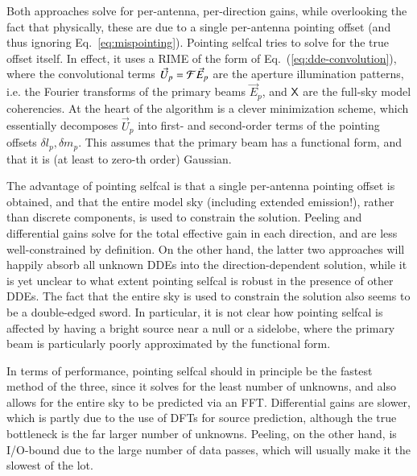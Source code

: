 \documentclass{aa}
\newcommand{\jones}[2]{\vec {#1}_{#2}}
\newcommand{\coh}[2]{\mathsf{{#1}}_{{#2}}}
\begin{document}
Both approaches solve for per-antenna, per-direction gains, while overlooking the fact that physically, these are due to a single per-antenna pointing offset (and thus ignoring Eq.~\ref{eq:mispointing}). Pointing selfcal tries to solve for the true offset itself. In effect, it uses a RIME of the form of Eq.~(\ref{eq:dde-convolution}), where the convolutional terms $\jones{U}{p}={\cal F}\jones{E}{p}$ are the aperture illumination patterns, i.e. the Fourier transforms of the primary beams $\jones{E}{p}$, and $\coh{X}{}$ are the full-sky model coherencies. At the heart of the algorithm is a clever minimization scheme, which essentially decomposes $\jones{U}{p}$ into first- and second-order terms of the pointing offsets $\delta l_p,\delta m_p$. This assumes that the primary beam has a functional form, and that it is (at least to zero-th order) Gaussian. 

The advantage of pointing selfcal is that a single per-antenna pointing offset is obtained, and that the entire model sky (including extended emission!), rather than discrete components, is used to constrain the solution. Peeling and differential gains solve for the total effective gain in each direction, and are less well-constrained by definition. On the other hand, the latter two approaches will happily absorb all unknown DDEs into the direction-dependent solution, while it is yet unclear to what extent pointing selfcal is robust in the presence of other DDEs. The fact that the entire sky is used to constrain the solution also seems to be a double-edged sword. In particular, it is not clear how pointing selfcal is affected by having a bright source near a null or a sidelobe, where the primary beam is particularly poorly approximated by the functional form. 

In terms of performance, pointing selfcal should in principle be the fastest method of the three, since it solves for the least number of unknowns, and also allows for the entire sky to be predicted via an FFT. Differential gains are slower, which is partly due to the use of DFTs for source prediction, although the true bottleneck is the far larger number of unknowns. Peeling, on the other hand, is I/O-bound due to the large number of data passes, which will usually make it the slowest of the lot. 
\end{document}
